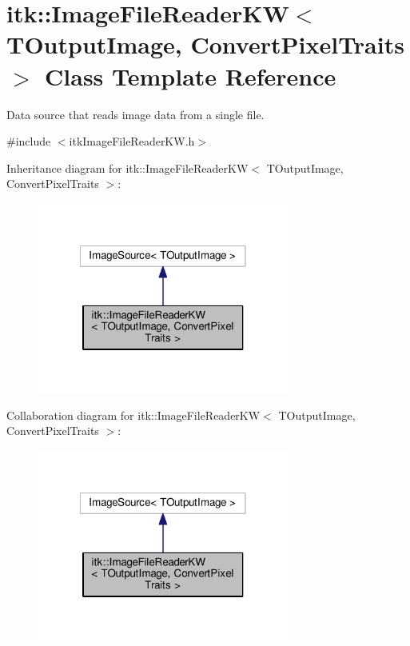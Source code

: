 \hypertarget{classitk_1_1_image_file_reader_k_w}{\section{itk\-:\-:Image\-File\-Reader\-K\-W$<$ T\-Output\-Image, Convert\-Pixel\-Traits $>$ Class Template Reference}
\label{classitk_1_1_image_file_reader_k_w}
}


Data source that reads image data from a single file.  




{\ttfamily \#include $<$itk\-Image\-File\-Reader\-K\-W.\-h$>$}



Inheritance diagram for itk\-:\-:Image\-File\-Reader\-K\-W$<$ T\-Output\-Image, Convert\-Pixel\-Traits $>$\-:
\nopagebreak
\begin{figure}[H]
\begin{center}
\leavevmode
\includegraphics[width=234pt]{classitk_1_1_image_file_reader_k_w__inherit__graph}
\end{center}
\end{figure}


Collaboration diagram for itk\-:\-:Image\-File\-Reader\-K\-W$<$ T\-Output\-Image, Convert\-Pixel\-Traits $>$\-:
\nopagebreak
\begin{figure}[H]
\begin{center}
\leavevmode
\includegraphics[width=234pt]{classitk_1_1_image_file_reader_k_w__coll__graph}
\end{center}
\end{figure}
